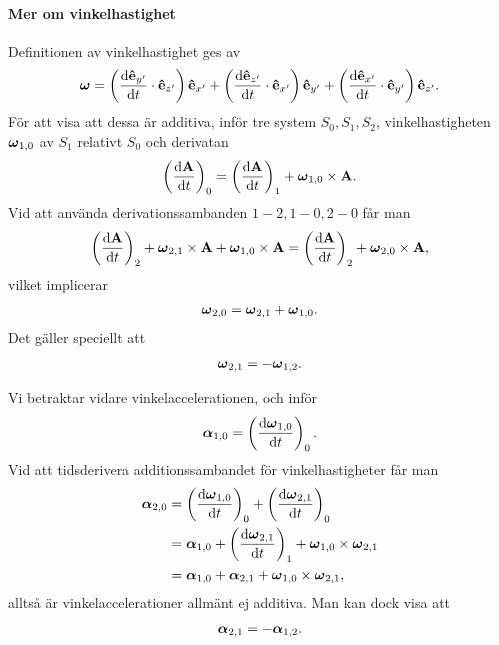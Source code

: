 \paragraph{Mer om vinkelhastighet}
Definitionen av vinkelhastighet ges av
\begin{align*}
	\vb*{\omega} = \left(\dv{\vu{e}_{y'}}{t}\cdot\vu{e}_{z'}\right)\vu{e}_{x'} + \left(\dv{\vu{e}_{z'}}{t}\cdot\vu{e}_{x'}\right)\vu{e}_{y'} + \left(\dv{\vu{e}_{x'}}{t}\cdot\vu{e}_{y'}\right)\vu{e}_{z'}.
\end{align*}
För att visa att dessa är additiva, inför tre system $S_0, S_1, S_2$, vinkelhastigheten $\vb*{\omega}_{1, 0}$ av $S_1$ relativt $S_0$ och derivatan
\begin{align*}
	\left(\dv{\vb{A}}{t}\right)_{0} = \left(\dv{\vb{A}}{t}\right)_{1} + \vb*{\omega}_{1, 0}\times\vb{A}.
\end{align*}
Vid att använda derivationssambanden $1 - 2, 1 - 0, 2 - 0$ får man
\begin{align*}
	\left(\dv{\vb{A}}{t}\right)_{2} + \vb*{\omega}_{2, 1}\times\vb{A} + \vb*{\omega}_{1, 0}\times\vb{A} = \left(\dv{\vb{A}}{t}\right)_{2} + \vb*{\omega}_{2, 0}\times\vb{A},
\end{align*}
vilket implicerar
\begin{align*}
	\vb*{\omega}_{2, 0} = \vb*{\omega}_{2, 1} + \vb*{\omega}_{1, 0}.
\end{align*}
Det gäller speciellt att
\begin{align*}
	\vb*{\omega}_{2, 1} = -\vb*{\omega}_{1, 2}.
\end{align*}

Vi betraktar vidare vinkelaccelerationen, och inför
\begin{align*}
	\vb*{\alpha}_{1, 0} = \left(\dv{\vb*{\omega}_{1, 0}}{t}\right)_{0}.
\end{align*}
Vid att tidsderivera additionssambandet för vinkelhastigheter får man
\begin{align*}
	\vb*{\alpha}_{2, 0} &= \left(\dv{\vb*{\omega}_{1, 0}}{t}\right)_{0} + \left(\dv{\vb*{\omega}_{2, 1}}{t}\right)_{0} \\
	                    &= \vb*{\alpha}_{1, 0} + \left(\dv{\vb*{\omega}_{2, 1}}{t}\right)_{1} + \vb*{\omega}_{1, 0}\times\vb*{\omega}_{2, 1} \\
	                    &= \vb*{\alpha}_{1, 0} + \vb*{\alpha}_{2, 1} + \vb*{\omega}_{1, 0}\times\vb*{\omega}_{2, 1},
\end{align*}
alltså är vinkelaccelerationer allmänt ej additiva. Man kan dock visa att
\begin{align*}
	\vb*{\alpha}_{2, 1} =- \vb*{\alpha}_{1, 2}.
\end{align*}

